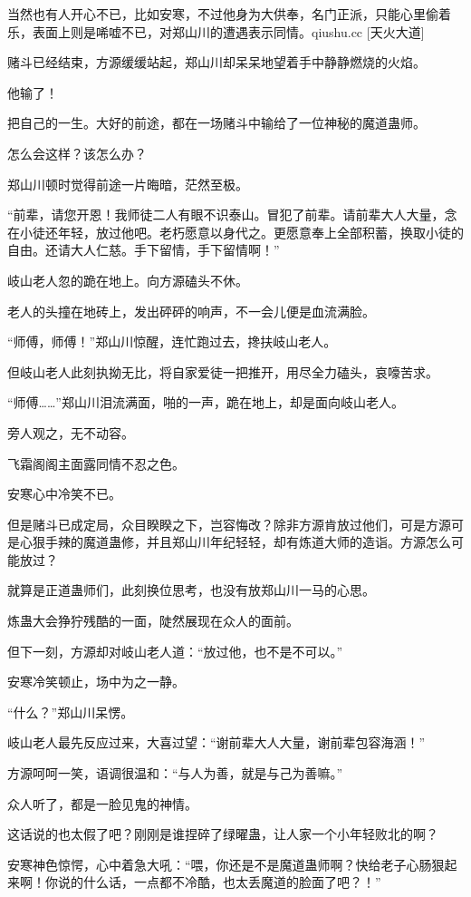\begin{this_body}
当然也有人开心不已，比如安寒，不过他身为大供奉，名门正派，只能心里偷着乐，表面上则是唏嘘不已，对郑山川的遭遇表示同情。qiushu.cc [天火大道]

赌斗已经结束，方源缓缓站起，郑山川却呆呆地望着手中静静燃烧的火焰。

他输了！

把自己的一生。大好的前途，都在一场赌斗中输给了一位神秘的魔道蛊师。

怎么会这样？该怎么办？

郑山川顿时觉得前途一片晦暗，茫然至极。

“前辈，请您开恩！我师徒二人有眼不识泰山。冒犯了前辈。请前辈大人大量，念在小徒还年轻，放过他吧。老朽愿意以身代之。更愿意奉上全部积蓄，换取小徒的自由。还请大人仁慈。手下留情，手下留情啊！”

岐山老人忽的跪在地上。向方源磕头不休。

老人的头撞在地砖上，发出砰砰的响声，不一会儿便是血流满脸。

“师傅，师傅！”郑山川惊醒，连忙跑过去，搀扶岐山老人。

但岐山老人此刻执拗无比，将自家爱徒一把推开，用尽全力磕头，哀嚎苦求。

“师傅……”郑山川泪流满面，啪的一声，跪在地上，却是面向岐山老人。

旁人观之，无不动容。

飞霜阁阁主面露同情不忍之色。

安寒心中冷笑不已。

但是赌斗已成定局，众目睽睽之下，岂容悔改？除非方源肯放过他们，可是方源可是心狠手辣的魔道蛊修，并且郑山川年纪轻轻，却有炼道大师的造诣。方源怎么可能放过？

就算是正道蛊师们，此刻换位思考，也没有放郑山川一马的心思。

炼蛊大会狰狞残酷的一面，陡然展现在众人的面前。

但下一刻，方源却对岐山老人道：“放过他，也不是不可以。”

安寒冷笑顿止，场中为之一静。

“什么？”郑山川呆愣。

岐山老人最先反应过来，大喜过望：“谢前辈大人大量，谢前辈包容海涵！”

方源呵呵一笑，语调很温和：“与人为善，就是与己为善嘛。”

众人听了，都是一脸见鬼的神情。

这话说的也太假了吧？刚刚是谁捏碎了绿曜蛊，让人家一个小年轻败北的啊？

安寒神色惊愕，心中着急大吼：“喂，你还是不是魔道蛊师啊？快给老子心肠狠起来啊！你说的什么话，一点都不冷酷，也太丢魔道的脸面了吧？！”


\end{this_body}

